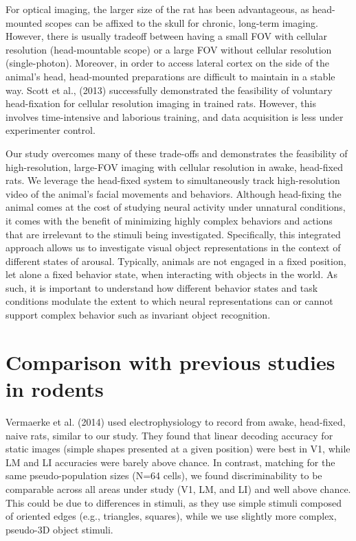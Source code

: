 For optical imaging, the larger size of the rat has been advantageous, as head-mounted scopes can be affixed to the skull for chronic, long-term imaging. However, there is usually tradeoff between having a small FOV with cellular resolution (head-mountable scope) or a large FOV without cellular resolution (single-photon). Moreover, in order to access lateral cortex on the side of the animal’s head, head-mounted preparations are difficult to maintain in a stable way. Scott et al., (2013) successfully demonstrated the feasibility of voluntary head-fixation for cellular resolution imaging in trained rats. However, this involves time-intensive and laborious training, and data acquisition is less under experimenter control. 

Our study overcomes many of these trade-offs and demonstrates the feasibility of high-resolution, large-FOV imaging with cellular resolution in awake, head-fixed rats. We leverage the head-fixed system to simultaneously track high-resolution video of the animal’s facial movements and behaviors. Although head-fixing the animal comes at the cost of studying neural activity under unnatural conditions, it comes with the benefit of minimizing highly complex behaviors and actions that are irrelevant to the stimuli being investigated. Specifically, this integrated approach allows us to investigate visual object representations in the context of different states of arousal. Typically, animals are not engaged in a fixed position, let alone a fixed behavior state, when interacting with objects in the world. As such, it is important to understand how different behavior states and task conditions modulate the extent to which neural representations can or cannot support complex behavior such as invariant object recognition.


\section{Comparison with previous studies in rodents}
Vermaerke et al. (2014) used electrophysiology to record from awake, head-fixed, naive rats, similar to our study. They found that linear decoding accuracy for static images (simple shapes presented at a given position) were best in V1, while LM and LI accuracies were barely above chance. In contrast, matching for the same pseudo-population sizes (N=64 cells), we found discriminability to be comparable across all areas under study (V1, LM, and LI) and well above chance. This could be due to differences in stimuli, as they use simple stimuli composed of oriented edges (e.g., triangles, squares), while we use slightly more complex, pseudo-3D object stimuli.

